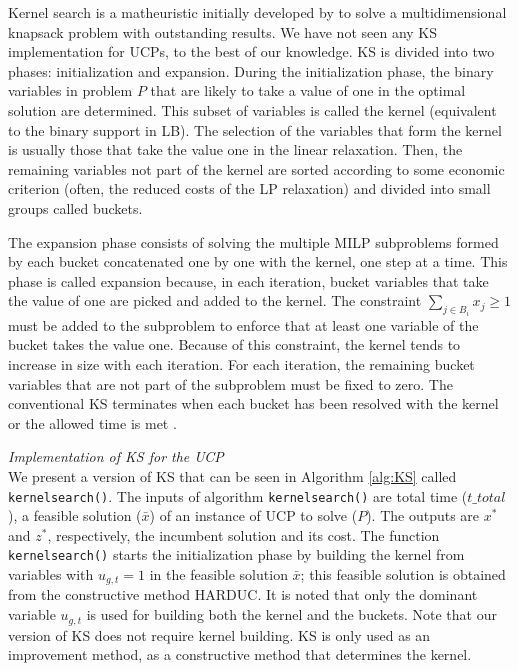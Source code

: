 Kernel search is a matheuristic initially developed by \citet{Angelelli2010} to solve a multidimensional knapsack problem with outstanding results. 
We have not seen any KS implementation for UCPs, to the best of our knowledge.
%
KS is divided into two phases: initialization and expansion. During the initialization phase, the binary variables in problem $P$ that are likely to take a value of one in the optimal solution are determined. This subset of variables is called the kernel (equivalent to the binary support in LB). The selection of the variables that form the kernel is usually those that take the value one in the linear relaxation.
%
Then, the remaining variables not part of the kernel are sorted according to some economic criterion (often, the reduced costs of the LP relaxation) and divided into small groups called buckets. 

The expansion phase consists of solving the multiple MILP subproblems formed by each bucket concatenated one by one with the kernel, one step at a time. This phase is called expansion because, in each iteration, bucket variables that take the value of one are picked and added to the kernel. The constraint  $\sum_{j\in B_{i}}x_{j} \geq 1$ must be added to the subproblem to enforce that at least one variable of the bucket takes the value one. Because of this constraint, the kernel tends to increase in size with each iteration. For each iteration, the remaining bucket variables that are not part of the subproblem must be fixed to zero. The conventional KS terminates when each bucket has been resolved with the kernel or the allowed time is met \citep{Angelelli2010}. %

\vspace{1em}\noindent\textit{Implementation of KS for the UCP}\\

We present a version of KS that can be seen in Algorithm \ref{alg:KS} called \texttt{kernelsearch()}. 
The inputs of algorithm \texttt{kernelsearch()} are total time ($\textit{t\_total}$),  a feasible solution ($\bar{x}$) of an instance of UCP to solve ($P$). The outputs are $x^{*}$ and $z^{*}$, respectively, the incumbent solution and its cost.
The function \texttt{kernelsearch()} starts the initialization phase by building the kernel from variables with $u_{g,t}=1$ in the feasible solution $\bar{x}$; this feasible solution is obtained from the constructive method HARDUC. 
It is noted that only the dominant variable $u_{g,t}$ is used for building both the kernel and the buckets. 
Note that our version of KS does not require kernel building. KS is only used as an improvement method, as a constructive method that determines the kernel.

